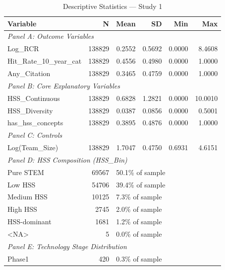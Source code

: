 \begin{table}[htbp]
\centering
\caption{Descriptive Statistics --- Study 1}
\label{tab:desc_study1}
\begin{tabular}{lrrrrr}
\toprule
\textbf{Variable} & \textbf{N} & \textbf{Mean} & \textbf{SD} & \textbf{Min} & \textbf{Max} \\
\midrule
\multicolumn{6}{l}{\textit{Panel A: Outcome Variables}} \\
Log\_RCR & 138829 & 0.2552 & 0.5692 & 0.0000 & 8.4608 \\
Hit\_Rate\_10\_year\_cat & 138829 & 0.4556 & 0.4980 & 0.0000 & 1.0000 \\
Any\_Citation & 138829 & 0.3465 & 0.4759 & 0.0000 & 1.0000 \\
\multicolumn{6}{l}{\textit{Panel B: Core Explanatory Variables}} \\
HSS\_Continuous & 138829 & 0.6828 & 1.2821 & 0.0000 & 10.0010 \\
HSS\_Diversity & 138829 & 0.0387 & 0.0856 & 0.0000 & 0.5001 \\
has\_hss\_concepts & 138829 & 0.3895 & 0.4876 & 0.0000 & 1.0000 \\
\multicolumn{6}{l}{\textit{Panel C: Controls}} \\
Log(Team\_Size) & 138829 & 1.7047 & 0.4750 & 0.6931 & 4.6151 \\
\midrule
\multicolumn{6}{l}{\textit{Panel D: HSS Composition (HSS\_Bin)}} \\
\hspace{0.4cm} Pure STEM & 69567 & \multicolumn{4}{l}{50.1\% of sample} \\
\hspace{0.4cm} Low HSS & 54706 & \multicolumn{4}{l}{39.4\% of sample} \\
\hspace{0.4cm} Medium HSS & 10125 & \multicolumn{4}{l}{7.3\% of sample} \\
\hspace{0.4cm} High HSS & 2745 & \multicolumn{4}{l}{2.0\% of sample} \\
\hspace{0.4cm} HSS-dominant & 1681 & \multicolumn{4}{l}{1.2\% of sample} \\
\hspace{0.4cm} <NA> & 5 & \multicolumn{4}{l}{0.0\% of sample} \\
\midrule
\multicolumn{6}{l}{\textit{Panel E: Technology Stage Distribution}} \\
\hspace{0.4cm} Phase1 & 420 & \multicolumn{4}{l}{0.3\% of sample} \\

\end{tabular}
\end{table}
